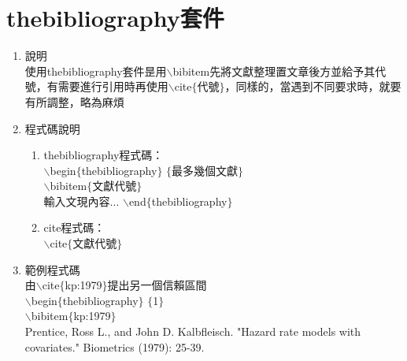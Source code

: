 \section{thebibliography套件}
\begin{enumerate}
\item 說明\\
使用thebibliography套件昰用$\backslash$bibitem先將文獻整理置文章後方並給予其代號，有需要進行引用時再使用$\backslash$cite$\{$代號$\}$，同樣的，當遇到不同要求時，就要有所調整，略為麻煩\\
\item 程式碼說明\\
\begin{enumerate}[1.]
\item thebibliography程式碼：\\
$\backslash$begin$\{$thebibliography$\}$ $\{$最多幾個文獻$\}$\\
$\backslash$bibitem$\{$文獻代號$\}$\\
輸入文現內容...
$\backslash$end$\{$thebibliography$\}$
\item cite程式碼：\\
$\backslash$cite$\{$文獻代號$\}$\\
\end{enumerate}
\item 範例程式碼\\

由$\backslash$cite$\{$kp:1979$\}$提出另一個信賴區間\\
$\backslash$begin$\{$thebibliography$\}$ $\{$1$\}$\\
$\backslash$bibitem$\{$kp:1979$\}$\\
Prentice, Ross L., and John D. Kalbfleisch. "Hazard rate models with covariates." Biometrics (1979): 25-39.\\
\end{enumerate}
